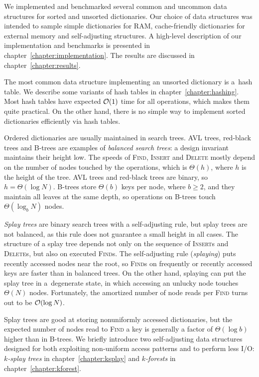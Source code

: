 We implemented and benchmarked several common and uncommon data structures
for sorted and unsorted dictionaries. Our choice of data structures was
intended to sample simple dictionaries for RAM, cache-friendly dictionaries
for external memory and self-adjusting structures.
A high-level description of our implementation and benchmarks is presented
in chapter~\ref{chapter:implementation}. The results are discussed in
chapter~\ref{chapter:results}.

The most common data structure implementing an unsorted dictionary is a~hash
table. We describe some variants of hash tables in chapter~\ref{chapter:hashing}.
Most hash tables have expected $\mathcal{O}(1)$ time for all operations, which
makes them quite practical. On the other hand, there is no simple way to
implement sorted dictionaries efficiently via hash tables.

Ordered dictionaries are usually maintained in search trees.
AVL trees, red-black trees and B-trees are examples of \emph{balanced search
trees}: a design invariant maintains their height low. The speeds
of \textsc{Find}, \textsc{Insert} and \textsc{Delete} mostly depend
on the number of nodes touched by the operations, which is $\Theta(h)$, where
$h$ is the height of the tree. AVL trees and red-black trees are binary, so
$h=\Theta(\log N)$. B-trees store $\Theta(b)$ keys per node, where $b\geq 2$,
and they maintain all leaves at the same depth, so operations on B-trees
touch $\Theta(\log_b N)$ nodes.

\emph{Splay trees} are binary search trees with a self-adjusting rule, but splay
trees are not balanced, as this rule does not guarantee a small height in all
cases. The structure of a splay tree depends not only on the sequence of
\textsc{Insert}s and \textsc{Delete}s, but also on executed \textsc{Find}s.
The self-adjusting rule (\emph{splaying}) puts recently accessed nodes
near the root, so \textsc{Find}s on frequently or recently accessed keys
are faster than in balanced trees. On the other hand, splaying can put
the splay tree in a~degenerate state, in which accessing an unlucky node
touches $\Theta(N)$ nodes. Fortunately, the amortized number of node
reads per \textsc{Find} turns out to be $\mathcal{O}(\log N)$.

Splay trees are good at storing nonuniformly accessed dictionaries, but
the expected number of nodes read to \textsc{Find} a key is generally a factor
of $\Theta(\log b)$ higher than in B-trees. We briefly introduce two
self-adjusting data structures designed for both exploiting non-uniform
access patterns and to perform less I/O: \emph{$k$-splay trees} in
chapter~\ref{chapter:ksplay} and \emph{$k$-forests} in
chapter~\ref{chapter:kforest}.

